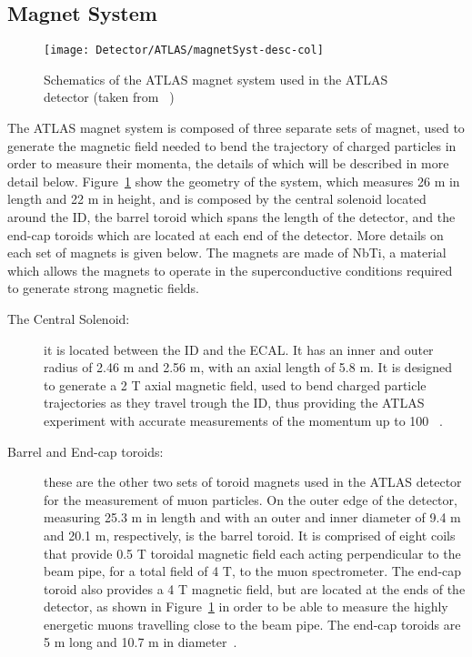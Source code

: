 	\subsection{Magnet System}
	\label{subsec:magnet}
		\begin{figure}[!hbt]
		\begin{center}
		\texttt{[image: Detector/ATLAS/magnetSyst-desc-col]}
		\end{center}
		\caption{Schematics of the \ac{ATLAS} magnet system used in the \ac{ATLAS} detector (taken from ~\cite{Zn})}
		\label{fig:magnets}
		\end{figure}
	The \ac{ATLAS} magnet system is composed of three separate sets of magnet, used to generate the magnetic field needed to bend the trajectory of charged particles in order to measure their momenta, the details of which will be described in more detail below. 
	Figure~\ref{fig:magnets} show the geometry of the system, which measures 26 m in length and 22 m in height, and is composed by the central solenoid located around the \ac{ID}, the barrel toroid which spans the length of the detector, and the end-cap toroids which are located at each end of the detector. 
	More details on each set of magnets is given below. 
	The magnets are made of \ac{NbTi}, a material which allows the magnets to operate in the superconductive conditions required to generate strong magnetic fields. 
	\begin{description}
	\item[The Central Solenoid:] it is located between the \ac{ID} and the \ac{ECAL}. It has an inner and outer radius of 2.46 m and 2.56 m, with an axial length of 5.8 m. It is designed to generate a 2 T axial magnetic field, used to bend charged particle trajectories as they travel trough the \ac{ID}, thus providing the \ac{ATLAS} experiment with accurate measurements of the momentum up to 100 \gev ~\cite{YAMAMOTO200853}.
	\item[Barrel and End-cap toroids:] these are the other two sets of toroid magnets used in the \ac{ATLAS} detector for the measurement of muon particles. On the outer edge of the detector, measuring 25.3 m in length and with an outer and inner diameter of 9.4 m and 20.1 m, respectively, is the barrel toroid. It is comprised of eight coils that provide 0.5 T toroidal magnetic field each acting perpendicular to the beam pipe, for a total field of 4 T, to the muon spectrometer. The end-cap toroid also provides a 4 T magnetic field, but are located at the ends of the detector, as shown in Figure~\ref{fig:magnets} in order to be able to measure the highly energetic muons travelling close to the beam pipe. The end-cap toroids are 5 m long and 10.7 m in diameter~\cite{ATLASJINST}. 
	\end{description}

